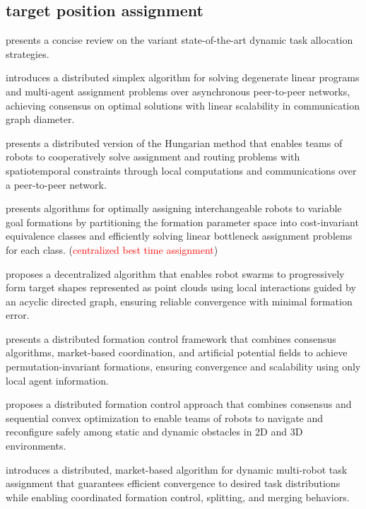 \subsection{target position assignment}

\cite{rm2020review} presents a concise review on the variant state-of-the-art dynamic task allocation strategies.

\cite{burger2012distributed} introduces a distributed simplex algorithm for solving degenerate linear programs and multi-agent assignment problems over asynchronous peer-to-peer networks, achieving consensus on optimal solutions with linear scalability in communication graph diameter.

\cite{chopra2017distributed} presents a distributed version of the Hungarian method that enables teams of robots to cooperatively solve assignment and routing problems with spatiotemporal constraints through local computations and communications over a peer-to-peer network.

\cite{akella2020assignment} presents algorithms for optimally assigning interchangeable robots to variable goal formations by partitioning the formation parameter space into cost-invariant equivalence classes and efficiently solving linear bottleneck assignment problems for each class. (\textcolor{red}{centralized best time assignment})

\cite{li2019decentralized} proposes a decentralized algorithm that enables robot swarms to progressively form target shapes represented as point clouds using local interactions guided by an acyclic directed graph, ensuring reliable convergence with minimal formation error.

\cite{zavlanos2007distributed} presents a distributed formation control framework that combines consensus algorithms, market-based coordination, and artificial potential fields to achieve permutation-invariant formations, ensuring convergence and scalability using only local agent information.

\cite{alonso2016distributed} proposes a distributed formation control approach that combines consensus and sequential convex optimization to enable teams of robots to navigate and reconfigure safely among static and dynamic obstacles in 2D and 3D environments.

\cite{michael2008distributed} introduces a distributed, market-based algorithm for dynamic multi-robot task assignment that guarantees efficient convergence to desired task distributions while enabling coordinated formation control, splitting, and merging behaviors.

